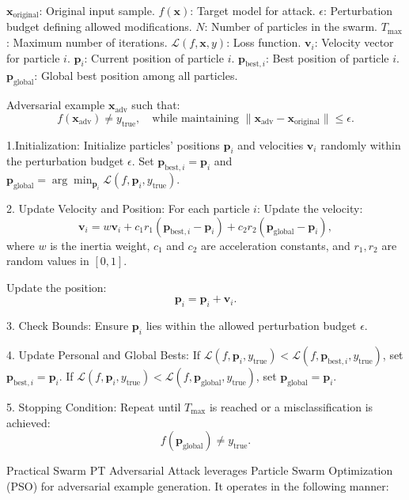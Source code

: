 $\mathbf{x}_{\text{original}}$: Original input sample.  
$f(\mathbf{x})$: Target model for attack.  
$\epsilon$: Perturbation budget defining allowed modifications.  
$N$: Number of particles in the swarm.  
$T_{\text{max}}$: Maximum number of iterations.  
$\mathcal{L}(f, \mathbf{x}, y)$: Loss function.  
$\mathbf{v}_i$: Velocity vector for particle $i$.  
$\mathbf{p}_i$: Current position of particle $i$.  
$\mathbf{p}_{\text{best}, i}$: Best position of particle $i$.  
$\mathbf{p}_{\text{global}}$: Global best position among all particles.  

Adversarial example $\mathbf{x}_{\text{adv}}$ such that:  
\[
f(\mathbf{x}_{\text{adv}}) \neq y_{\text{true}}, \quad \text{while maintaining $\|\mathbf{x}_{\text{adv}} - \mathbf{x}_{\text{original}}\| \leq \epsilon$}.
\]

1.Initialization:  
   Initialize particles' positions $\mathbf{p}_i$ and velocities $\mathbf{v}_i$ randomly within the perturbation budget $\epsilon$.  
   Set $\mathbf{p}_{\text{best}, i} = \mathbf{p}_i$ and $\mathbf{p}_{\text{global}} = \arg\min_{\mathbf{p}_i} \mathcal{L}(f, \mathbf{p}_i, y_{\text{true}})$.  

2. Update Velocity and Position: For each particle $i$:  
   Update the velocity:  
   \[
   \mathbf{v}_i = w \mathbf{v}_i + c_1 r_1 (\mathbf{p}_{\text{best}, i} - \mathbf{p}_i) + c_2 r_2 (\mathbf{p}_{\text{global}} - \mathbf{p}_i),
   \]  
   where $w$ is the inertia weight, $c_1$ and $c_2$ are acceleration constants, and $r_1, r_2$ are random values in $[0, 1]$.  

   Update the position:  
   \[
   \mathbf{p}_i = \mathbf{p}_i + \mathbf{v}_i.  
   \]

3. Check Bounds:  
   Ensure $\mathbf{p}_i$ lies within the allowed perturbation budget $\epsilon$.  

4. Update Personal and Global Bests:  
   If $\mathcal{L}(f, \mathbf{p}_i, y_{\text{true}}) < \mathcal{L}(f, \mathbf{p}_{\text{best}, i}, y_{\text{true}})$, set $\mathbf{p}_{\text{best}, i} = \mathbf{p}_i$.  
   If $\mathcal{L}(f, \mathbf{p}_i, y_{\text{true}}) < \mathcal{L}(f, \mathbf{p}_{\text{global}}, y_{\text{true}})$, set $\mathbf{p}_{\text{global}} = \mathbf{p}_i$.  

5. Stopping Condition:  
   Repeat until $T_{\text{max}}$ is reached or a misclassification is achieved:  
   \[
   f(\mathbf{p}_{\text{global}}) \neq y_{\text{true}}.  
   \]  

Practical Swarm PT Adversarial Attack leverages Particle Swarm Optimization (PSO) for adversarial example generation. It operates in the following manner:  

